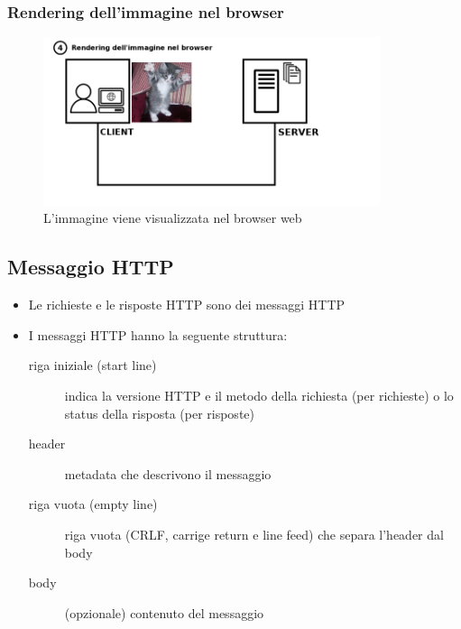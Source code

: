 \documentclass{beamer}
\begin{document}
\subsubsection*{Rendering dell'immagine nel browser}
\begin{frame}{\insertsubsection}{\insertsubsubsection}
\begin{figure}
\includegraphics[width=0.88\textwidth]{imgs/http-kittenwar-4.png}
\caption{L'immagine viene visualizzata nel browser web}
\end{figure}
\end{frame}

\subsection*{Messaggio HTTP}
\begin{frame}{\insertsection}{\insertsubsection}
\begin{itemize}
\item Le richieste e le risposte HTTP sono dei \alert{messaggi HTTP}
\item I messaggi HTTP hanno la seguente struttura:
\begin{description}
\item[riga iniziale (start line)] indica la versione HTTP e il metodo della
richiesta (per richieste) o lo status della risposta (per risposte)
\item[header] metadata che descrivono il messaggio
\item[riga vuota (empty line)] riga vuota (CRLF, carrige return e line feed)
che separa l'header dal body
\item[body] (opzionale) contenuto del messaggio
\end{description}
\end{itemize}
\end{frame}
\end{document}
